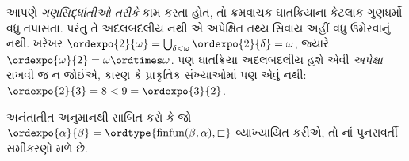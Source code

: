 \documentclass[../../../include/open-logic-section]{subfiles}
\begin{document}
આપણે \emph{ગણસિદ્ધાંતીઓ તરીકે} કામ કરતા હોત,
તો ક્રમવાચક ઘાતક્રિયાના કેટલાક ગુણધર્મો વધુ
તપાસતા. પરંતુ તે અદલબદલીય નથી એ અપેક્ષિત
તથ્ય સિવાય અહીં વધુ ઉમેરવાનું નથી. ખરેખર
$\ordexpo{2}{\omega} =
\bigcup_{\delta < \omega}\ordexpo{2}{\delta} = \omega$,
જ્યારે $\ordexpo{\omega}{2} = \omega \ordtimes \omega$.
પણ ઘાતક્રિયા અદલબદલીય હશે એવી \emph{અપેક્ષા}
રાખવી જ ન જોઈએ, કારણ કે પ્રાકૃતિક સંખ્યાઓમાં પણ
એવું નથી: $\ordexpo{2}{3} = 8 < 9 = \ordexpo{3}{2}$.

\begin{prob}
અનંતાતીત અનુમાનથી સાબિત કરો કે જો
$\ordexpo{\alpha}{\beta} = \ordtype{\text{finfun}(\beta, \alpha),
\sqsubset}$ વ્યાખ્યાયિત કરીએ, તો
નાં
પુનરાવર્તી સમીકરણો મળે છે.
\end{prob}
\end{document}
